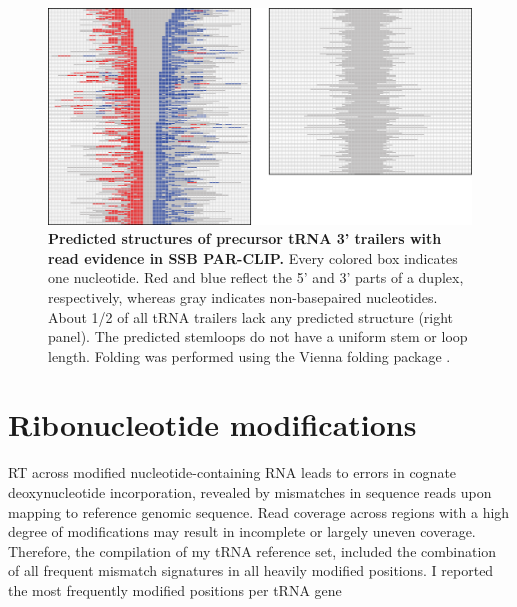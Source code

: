\documentclass[12pt]{rockefeller}
\begin{document}
\begin{figure}[!ht]%
\centering
\includegraphics[width=\textwidth]{supp5.png}%
\caption[Predicted structures of precursor tRNA 3’ trailers with read evidence in SSB PAR-CLIP.]
{\textbf{Predicted structures of precursor tRNA 3’ trailers with read evidence in SSB PAR-CLIP.}
Every colored box indicates one nucleotide. Red and blue reflect the 5’ and 3’ parts of a duplex, respectively, whereas gray indicates non-basepaired nucleotides. About 1/2 of all tRNA trailers lack any predicted structure (right panel). The predicted stemloops do not have a uniform stem or loop length. Folding was performed using the Vienna folding package \cite{Lorenz:2011it}.}
\centering
\label{supp5}%
\end{figure}

\section{Ribonucleotide modifications}\label{modifications}

RT across modified nucleotide-containing RNA leads to errors in cognate deoxynucleotide incorporation, revealed by mismatches in sequence reads upon mapping to reference genomic sequence. Read coverage across regions with a high degree of modifications may result in incomplete or largely uneven coverage. Therefore, the compilation of my tRNA reference set, included the combination of all frequent mismatch signatures in all heavily modified positions. I reported the most frequently modified positions per tRNA gene 
\end{document}
